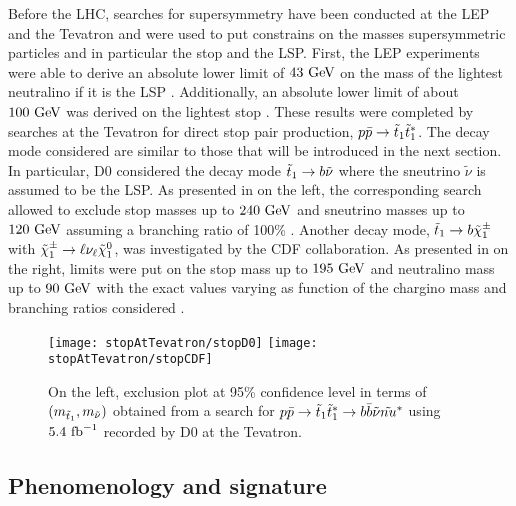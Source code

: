     Before the LHC, searches for supersymmetry have been conducted at the LEP and the
    Tevatron and were used to put constrains on the masses supersymmetric particles and
    in particular the stop and the LSP.
    First, the LEP experiments were able to derive an absolute lower limit of $43~\text{GeV}$ on the
    mass of the lightest neutralino if it is the LSP \cite{LEPLSP}. Additionally, an absolute
    lower limit of about $100~\text{GeV}$ was derived on the lightest stop \cite{LEPstop}. These
    results were completed by searches at the Tevatron for direct stop pair production,
    $p\bar{p} \rightarrow \tilde{t}_1 \tilde{t}_1^*$. The decay mode considered are similar to those
    that will be introduced in the next section. In particular, D0 considered the decay
    mode $\tilde{t}_1 \rightarrow b \tilde{\nu}$ where the sneutrino $\tilde{\nu}$ is assumed to
    be the LSP. As presented in  on the left, the corresponding
    search allowed to exclude stop masses up to $240~\text{GeV}$ and sneutrino masses up to
    $120~\text{GeV}$ assuming a branching ratio of 100\% \cite{TevatronStopSneutrino}.
    Another decay mode, $\tilde{t}_1 \rightarrow b \tilde{\chi}_1^\pm$ with $\tilde{\chi}_1^\pm \rightarrow \ell \nu_\ell \tilde{\chi}_1^0$,
    was investigated by the CDF collaboration. As presented in 
    on the right, limits were put on the stop mass up to $195~\text{GeV}$ and neutralino mass
    up to $90~\text{GeV}$ with the exact values varying as function of the chargino mass and branching
    ratios considered \cite{TevatronStopChargino}.

    \begin{figure}[h!]
        \centering
        \texttt{[image: stopAtTevatron/stopD0]}
        \texttt{[image: stopAtTevatron/stopCDF]}
        \caption{On the left, exclusion plot at 95\% confidence level in terms of
        $(m_{\tilde{t}_1},m_{\tilde{\nu}})$ obtained from a search for $p\bar{p}
        \rightarrow \tilde{t}_1 \tilde{t}_1^* \rightarrow b\bar{b} \tilde{\nu} \tilde{nu}^*$
        using $5.4~\text{fb}^{-1}$ recorded by D0 at the Tevatron.
        \label{fig:tevatronStop}}
    \end{figure}

    \subsection{Phenomenology and signature \label{sec:phenoAndSignature}}

